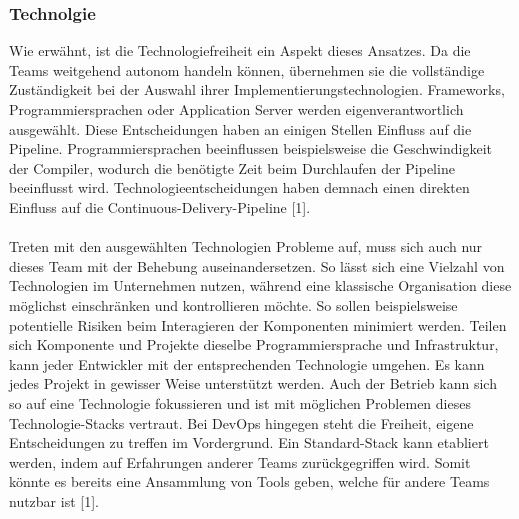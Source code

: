 \subsubsection{Technolgie}
Wie erwähnt, ist die Technologiefreiheit ein Aspekt dieses Ansatzes. Da die Teams weitgehend autonom handeln können, übernehmen sie die vollständige Zuständigkeit bei der Auswahl ihrer Implementierungstechnologien. Frameworks, Programmiersprachen oder Application Server werden eigenverantwortlich ausgewählt. Diese Entscheidungen haben an einigen Stellen Einfluss auf die Pipeline. Programmiersprachen beeinflussen beispielsweise die Geschwindigkeit der Compiler, wodurch die benötigte Zeit beim Durchlaufen der Pipeline beeinflusst wird. Technologieentscheidungen haben demnach einen direkten Einfluss auf die Continuous-Delivery-Pipeline [1].\\ \\
Treten mit den ausgewählten Technologien Probleme auf, muss sich auch nur dieses Team mit der Behebung auseinandersetzen. So lässt sich eine Vielzahl von Technologien im Unternehmen nutzen, während eine klassische Organisation diese möglichst einschränken und kontrollieren möchte. So sollen beispielsweise potentielle Risiken beim Interagieren der Komponenten minimiert werden. Teilen sich Komponente und Projekte dieselbe Programmiersprache und Infrastruktur, kann jeder Entwickler mit der entsprechenden Technologie umgehen. Es kann jedes Projekt in gewisser Weise unterstützt werden. Auch der Betrieb kann sich so auf eine Technologie fokussieren und ist mit möglichen Problemen dieses Technologie-Stacks vertraut. Bei DevOps hingegen steht die Freiheit, eigene Entscheidungen zu treffen im Vordergrund. Ein Standard-Stack kann etabliert werden, indem auf Erfahrungen anderer Teams zurückgegriffen wird. Somit könnte es bereits eine Ansammlung von Tools geben, welche für andere Teams nutzbar ist [1]. 

